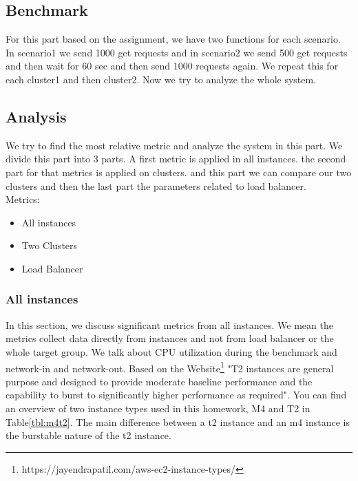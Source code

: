 \documentclass[12pt]{article}
\begin{document}
        \subsection{Benchmark}
         For this part based on the assignment, we have two functions for each scenario. In scenario1 we send 1000 get requests and in scenario2 we send 500 get requests and then wait for 60 sec and then send 1000 requests again. We repeat this for each cluster1 and then cluster2. Now we try to analyze the whole system. 

         \subsection{Analysis}
            We try to find the most relative metric and analyze the system in this part. We divide this part into 3 parts. A first metric is applied in all instances. the second part for that metrics is applied on clusters. and this part we can compare our two clusters and then the last part the parameters related to load balancer.\\
            
            Metrics: 
            \begin{itemize}
                \item All instances
                \item Two Clusters
                \item Load Balancer
            \end{itemize}

        

        \subsubsection{All instances}
        In this section, we discuss significant metrics from all instances. We mean the metrics collect data directly from instances and not from load balancer or the whole target group.
        We talk about CPU utilization during the benchmark and network-in and network-out. 
         Based on the Website\footnote{https://jayendrapatil.com/aws-ec2-instance-types/} "T2 instances are general purpose and designed to provide moderate baseline performance and the capability to burst to significantly higher performance as required". You can find an overview of two instance types used in this homework, M4 and T2 in Table\ref{tbl:m4t2}. The main difference between a t2 instance and an m4 instance is the burstable nature of the t2 instance.\\
        
\end{document}
